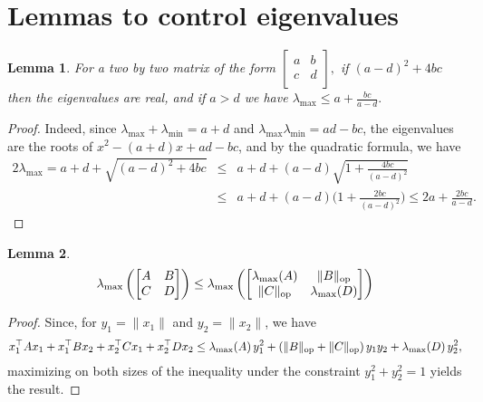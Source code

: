 \documentclass{article}
\def\op{{\rm op}}
\newtheorem{lemma}{Lemma}
\begin{document}
\section{Lemmas to control eigenvalues}
\begin{lemma}
For a two by two matrix of the form
$\begin{bmatrix}
a & b\\
c & d \\
\end{bmatrix},
$
if $(a-d)^2+4bc$ then the eigenvalues are real, and if $a>d$ we have  $\displaystyle \lambda_{\max}\leq a+\frac{bc}{a-d}.$
\end{lemma}
\begin{proof}
 Indeed, since $\lambda_{\max}+\lambda_{\min}=a+d$ and $\lambda_{\max}\lambda_{\min}=ad-bc$, the eigenvalues are the roots of $x^2-(a+d)x+ad-bc$, and by the quadratic formula, we have
\begin{eqnarray*}
2 \lambda_{\max} = a+d+\sqrt{(a-d)^2+4bc}  & \leq & a+d+(a-d) \sqrt{1+\frac{4bc}{(a-d)^2}}\\
& \leq & a+d+(a-d) \Big (1+\frac{2bc}{(a-d)^2} \Big )
\leq 2a +\frac{2bc}{a-d}.
\end{eqnarray*}
\end{proof}

\begin{lemma}
\label{lem:lmax_twobywto}
$$
\lambda_{\max} \left (
\begin{bmatrix}
A & B \\
C & D
\end{bmatrix}
\right)
 \leq 
\lambda_{\max} \left (
\begin{bmatrix}
\lambda_{\max}(A) & \|B\|_{\op} \\
\|C\|_{\op} & \lambda_{\max}(D)
\end{bmatrix}
\right ) 
$$
\end{lemma}
\begin{proof}
Since, for $y_1=\|x_1\|$ and $y_2=\|x_2\|$, we have
$$x_1^\top A x_1 + x_1^\top B x_2 + x_2^\top C x_1 + x_2^\top D x_2 \leq  \lambda_{\max}(A) \, y_1^2 +  (\|B\|_{\op}+  \|C\|_{\op}) \, y_1 y_2+ \lambda_{\max}(D) \, y_2^2,$$
 maximizing on both sizes of the inequality under the constraint $y_1^2+y_2^2=1$ yields the result. 
\end{proof}


\end{document}
